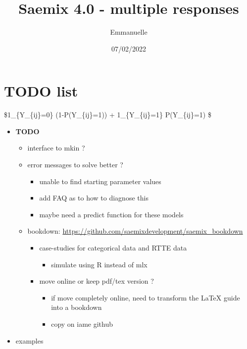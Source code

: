 \documentclass[
]{article}
\title{Saemix 4.0 - multiple responses}
\author{Emmanuelle}
\date{07/02/2022}
\providecommand{\tightlist}{%
  \setlength{\itemsep}{0pt}\setlength{\parskip}{0pt}}
\begin{document}
\maketitle

\hypertarget{todo-list}{%
\section{TODO list}\label{todo-list}}

\$1\_\{Y\_\{ij\}=0\} \times (1-P(Y\_\{ij\}=1)) + 1\_\{Y\_\{ij\}=1\}
\times P(Y\_\{ij\}=1) \$

\begin{itemize}
\tightlist
\item
  \textbf{TODO}

  \begin{itemize}
  \tightlist
  \item
    interface to mkin ?
  \item
    error messages to solve better ?

    \begin{itemize}
    \tightlist
    \item
      unable to find starting parameter values
    \item
      add FAQ as to how to diagnose this
    \item
      maybe need a predict function for these models
    \end{itemize}
  \item
    bookdown: \url{https://github.com/saemixdevelopment/saemix_bookdown}

    \begin{itemize}
    \tightlist
    \item
      case-studies for categorical data and RTTE data

      \begin{itemize}
      \tightlist
      \item
        simulate using R instead of mlx
      \end{itemize}
    \item
      move online or keep pdf/tex version ?

      \begin{itemize}
      \tightlist
      \item
        if move completely online, need to transform the LaTeX guide
        into a bookdown
      \item
        copy on iame github
      \end{itemize}
    \end{itemize}
  \end{itemize}
\item
  examples


\end{itemize}
\end{document}
